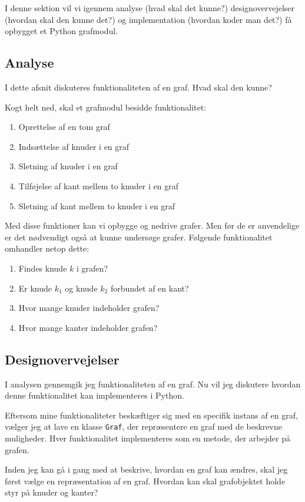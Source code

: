 \documentclass[10pt,a4paper,danish]{article}
\newcommand{\ct}{\texttt}
\begin{document}
I denne sektion vil vi igennem analyse (hvad skal det kunne?)
designovervejelser (hvordan skal den kunne det?) og implementation
(hvordan koder man det?) få opbygget et Python grafmodul.

\subsection{Analyse}
\label{sec:analyse}
I dette afsnit diskuteres funktionaliteten af en graf. Hvad skal den
kunne?

Kogt helt ned, skal et grafmodul besidde funktionalitet:
\begin{enumerate}
\item Oprettelse af en tom graf
\item Indsættelse af knuder i en graf
\item Sletning af knuder i en graf
\item Tilføjelse af kant mellem to knuder i en graf
\item Sletning af kant mellem to knuder i en graf
\end{enumerate}

Med disse funktioner kan vi opbygge og nedrive grafer. Men før de er
anvendelige er det nødvendigt også at kunne undersøge grafer. Følgende
funktionalitet omhandler netop dette:
\begin{enumerate}
\item Findes knude $k$ i grafen?
\item Er knude $k_1$ og knude $k_2$ forbundet af en kant?
\item Hvor mange knuder indeholder grafen?
\item Hvor mange kanter indeholder grafen?
\end{enumerate}


\subsection{Designovervejelser}
I analysen  gennemgik jeg funktionaliteten af en
graf. Nu vil jeg diskutere hvordan denne funktionalitet kan
implementeres i Python.

Eftersom mine funktionaliteter beskæftiger sig med en specifik instans
af en graf, vælger jeg at lave en klasse \ct{Graf}, der
repræsentere en graf med de beskrevne muligheder. Hver funktionalitet
implementeres som en metode, der arbejder på grafen.

Inden jeg kan gå i gang med at beskrive, hvordan en graf kan ændres,
skal jeg først vælge en repræsentation af en graf. Hvordan kan skal
grafobjektet holde styr på knuder og kanter?
\end{document}
